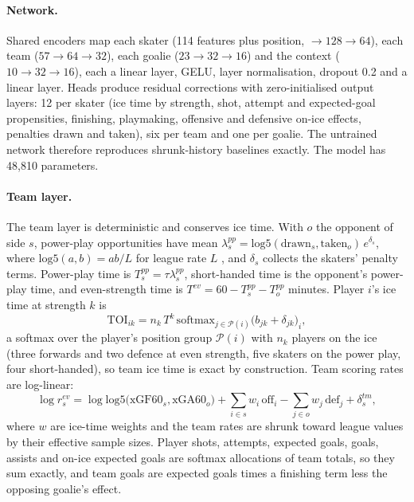 \paragraph{Network.}
Shared encoders map each skater (114 features plus position, $\to 128 \to 64$),
each team ($57 \to 64 \to 32$), each goalie ($23 \to 32 \to 16$) and the context
($10 \to 32 \to 16$), each a linear layer, GELU, layer normalisation, dropout
0.2 and a linear layer. Heads produce residual corrections with
zero-initialised output layers: 12 per skater (ice time by strength, shot,
attempt and expected-goal propensities, finishing, playmaking, offensive and
defensive on-ice effects, penalties drawn and taken), six per team and one per
goalie. The untrained network therefore reproduces shrunk-history baselines
exactly. The model has 48,810 parameters.

\paragraph{Team layer.}
The team layer is deterministic and conserves ice time. With $o$ the opponent
of side $s$, power-play opportunities have mean
$\lambda^{pp}_s = \mathrm{log5}(\text{drawn}_s, \text{taken}_o)\,e^{\delta_s}$,
where $\mathrm{log5}(a, b) = ab/L$ for league rate $L$ \citep{hammond2015james}, and $\delta_s$ collects
the skaters' penalty terms. Power-play time is $T^{pp}_s = \tau \lambda^{pp}_s$,
short-handed time is the opponent's power-play time, and even-strength time is
$T^{ev} = 60 - T^{pp}_s - T^{pp}_o$ minutes. Player $i$'s ice time at strength
$k$ is
\begin{equation}
\mathrm{TOI}_{ik} = n_k\, T^{k}\, \mathrm{softmax}_{j \in \mathcal{P}(i)}\bigl(b_{jk} + \delta_{jk}\bigr)_i,
\end{equation}
a softmax over the player's position group $\mathcal{P}(i)$ with $n_k$ players on
the ice (three forwards and two defence at even strength, five skaters on the
power play, four short-handed), so team ice time is exact by construction.
Team scoring rates are log-linear:
\begin{equation}
\log r^{ev}_s = \log \mathrm{log5}\bigl(\mathrm{xGF60}_s, \mathrm{xGA60}_o\bigr)
  + \sum_{i \in s} w_i\, \mathrm{off}_i - \sum_{j \in o} w_j\, \mathrm{def}_j + \delta^{tm}_s,
\end{equation}
where $w$ are ice-time weights and the team rates are shrunk toward league
values by their effective sample sizes. Player shots, attempts, expected goals,
goals, assists and on-ice expected goals are softmax allocations of team
totals, so they sum exactly, and team goals are expected goals times a
finishing term less the opposing goalie's effect.

